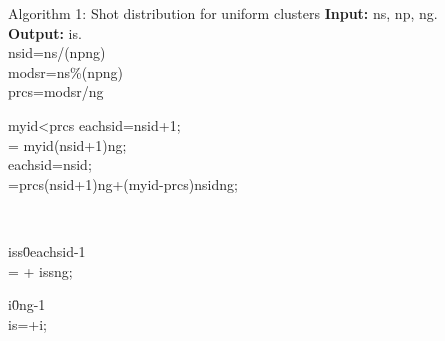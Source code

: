 \begin{algorithm}{Algorithm 1: Shot distribution for uniform clusters}{}
     \textbf{Input:}  ns,  np,  ng. \\
     \textbf{Output:}   is. \\
     nsid=ns/(np\times ng)\\
     modsr=ns\%(np\times ng) \\
     prcs=modsr/ng \\
    \begin{IF}{myid<prcs} 
     eachsid=nsid+1;\\
      = myid\times (nsid+1)\times ng;\\
    \ELSE
    eachsid=nsid;\\
    =prcs\times (nsid+1)\times ng+(myid-prcs)\times nsid\times ng;
    \end{IF} \\
    \begin{FOR}{iss\=0\cdots eachsid-1} \\
     =  + iss\times ng; \\ 
    \begin{FOR}{i\=0\cdots ng-1} \\
    is=+i;  
    \end{FOR}
    \end{FOR}
\end{algorithm}


